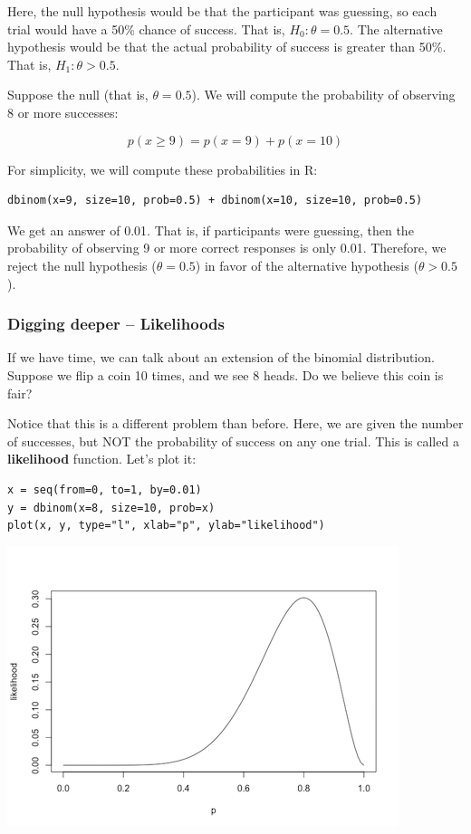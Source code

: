 \documentclass[11pt]{article}
\begin{document}
Here, the null hypothesis would be that the participant was guessing, so each trial would have a 50\% chance of success.  That is, $H_0: \theta=0.5$.  The alternative hypothesis would be that the actual probability of success is greater than 50\%.  That is, $H_1: \theta>0.5$.

Suppose the null (that is, $\theta=0.5$).  We will compute the probability of observing 8 or more successes:

\[
p(x\geq 9) = p(x=9) + p(x=10)
\]

For simplicity, we will compute these probabilities in R:

\begin{verbatim}
dbinom(x=9, size=10, prob=0.5) + dbinom(x=10, size=10, prob=0.5)
\end{verbatim}

We get an answer of 0.01.  That is, if participants were guessing, then the probability of observing 9 or more correct responses is only 0.01.  Therefore, we reject the null hypothesis ($\theta=0.5$) in favor of the alternative hypothesis ($\theta>0.5$).

\subsubsection*{Digging deeper -- Likelihoods}
\label{sec-2-1-5}
If we have time, we can talk about an extension of the binomial distribution.  Suppose we flip a coin 10 times, and we see 8 heads.  Do we believe this coin is fair?

Notice that this is a different problem than before.  Here, we are given the number of successes, but NOT the probability of success on any one trial.  This is called a \textbf{likelihood} function.  Let's plot it:

\begin{verbatim}
x = seq(from=0, to=1, by=0.01)
y = dbinom(x=8, size=10, prob=x)
plot(x, y, type="l", xlab="p", ylab="likelihood")
\end{verbatim}

\includegraphics[width=.9\linewidth]{figures/week1/likelihood.png}
\end{document}
